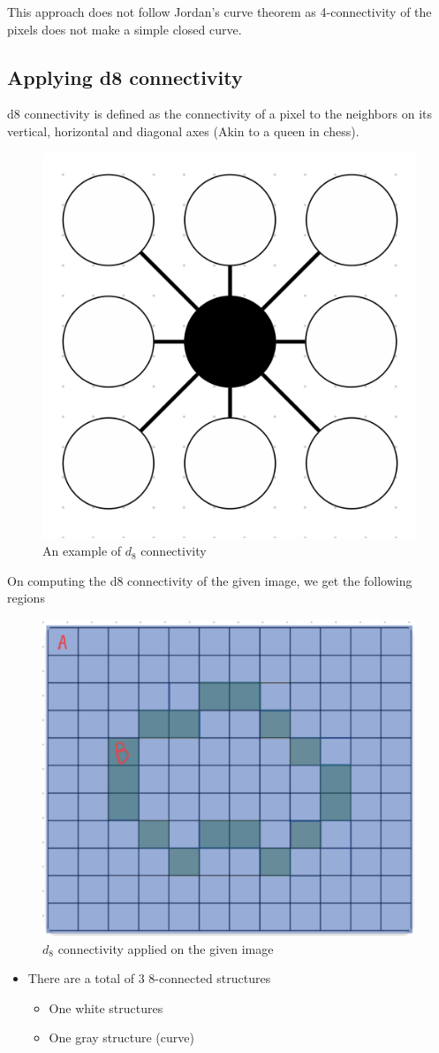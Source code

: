 \documentclass[a4paper,11pt]{article}
\begin{document}
This approach does not follow Jordan's curve theorem as 4-connectivity of the pixels does not make a simple closed curve.

\subsection{Applying d8 connectivity}

d8 connectivity is defined as the connectivity of a pixel to the neighbors on its vertical, horizontal and diagonal axes (Akin to a queen in chess). \newline
\begin{figure}[h]
    \centering
    \includegraphics[width=0.4\linewidth]{figs/d8_connectivity.png}
    \caption{An example of $d_8$ connectivity}
\end{figure}
\newline
On computing the d8 connectivity of the given image, we get the following regions
\begin{figure}[h]
    \centering
    \includegraphics[width=0.6\linewidth]{figs/D8_CONN.png}
    \caption{$d_8$ connectivity applied on the given image}
\end{figure}

\begin{itemize}
    \item There are a total of 3 8-connected structures
    \begin{itemize}
        \item One white structures
        \item One gray structure (curve)
    \end{itemize}
\end{itemize}
\end{document}
